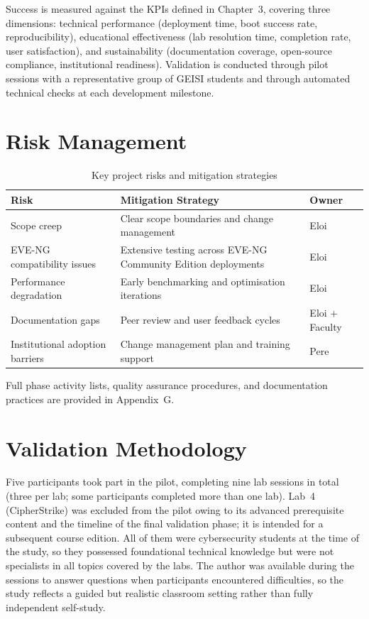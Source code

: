 Success is measured against the KPIs defined in Chapter~3, covering three dimensions:
technical performance (deployment time, boot success rate, reproducibility), educational
effectiveness (lab resolution time, completion rate, user satisfaction), and sustainability
(documentation coverage, open-source compliance, institutional readiness). Validation is
conducted through pilot sessions with a representative group of GEISI students and through
automated technical checks at each development milestone.

\section{Risk Management}

\begin{table}[H]
\centering
\small
\begin{tabularx}{\textwidth}{lXl}
\toprule
\textbf{Risk} & \textbf{Mitigation Strategy} & \textbf{Owner} \\
\midrule
Scope creep & Clear scope boundaries and change management & Eloi \\
EVE-NG compatibility issues & Extensive testing across EVE-NG Community Edition deployments & Eloi \\
Performance degradation & Early benchmarking and optimisation iterations & Eloi \\
Documentation gaps & Peer review and user feedback cycles & Eloi + Faculty \\
Institutional adoption barriers & Change management plan and training support & Pere \\
\bottomrule
\end{tabularx}
\caption{Key project risks and mitigation strategies}
\label{tab:risk_management}
\end{table}

Full phase activity lists, quality assurance procedures, and documentation
practices are provided in Appendix~G.

\section{Validation Methodology}\label{sec:pilot_design}

Five participants took part in the pilot, completing nine lab sessions in total (three per lab; some participants completed more than one lab). Lab~4 (CipherStrike) was excluded from the pilot owing to its advanced prerequisite content and the timeline of the final validation phase; it is intended for a subsequent course edition. All of them were cybersecurity students at the time of the study, so they possessed foundational technical knowledge but were not
specialists in all topics covered by the labs. The author was available
during the sessions to answer questions when participants encountered difficulties, so the
study reflects a guided but realistic classroom setting rather than fully
independent self-study.

